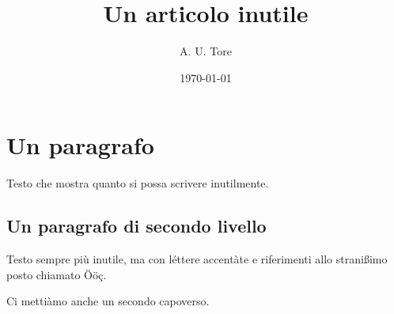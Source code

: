 \documentclass[a4paper]{article}
\title{Un articolo inutile}
\author{A. U. Tore}
\date{\today}
\begin{document}
\maketitle

\section{Un paragrafo}

Testo che mostra quanto si possa scrivere inutilmente.

\subsection{Un paragrafo di secondo livello}

Testo sempre più inutile, ma con léttere accentàte e riferimenti allo stranißimo posto chiamato Ööç.

Ci mettiàmo anche un secondo capoverso.
\end{document}
